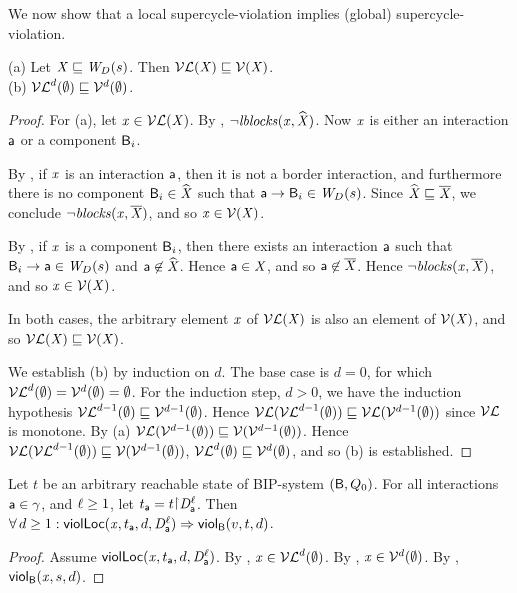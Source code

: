 We now show that a local supercycle-violation implies (global) supercycle-violation.

\begin{proposition}
\label{prop:lV-subg-V}
(a) Let $\XS \subg \lwfg{B}{s}{\DS}$. Then $\lVF{\XS} \subg \VF{\XS}$.\\
(b) $\lVFs^{d} (\ewfg) \subg \VFs^{d} (\ewfg)$.
\end{proposition}
%
\begin{proof}
For (a), let $\ndx \in \lVF{\XS}$. By , $\neg \lblocks{\ndx}{\complL{\XS}}$.
Now $\ndx$ is either an interaction $\act$ or a component $\B_i$. 

By , if $\ndx$ is an interaction $\act$, then it is not a border interaction, and furthermore there is no
component $\B_i \in \complL{\XS}$ such that $\act \ar \B_i \in \lwfg{B}{s}{\DS}$. 
Since $\complL{\XS} \subg \compl{\XS}$, we conclude $\neg \blocks{\ndx}{\compl{\XS}}$, and so $\ndx \in \VF{\XS}$.

By , if $\ndx$ is a component $\B_i$, then there exists an interaction $\act$ such that 
$\B_i \ar \act \in \lwfg{B}{s}{\DS}$ and $\act \not\in \complL{\XS}$. Hence $\act \in \XS$, and so $\act \not\in \compl{\XS}$.
Hence  $\neg \blocks{\ndx}{\compl{\XS}}$, and so $\ndx \in \VF{\XS}$.

In both cases, the arbitrary element $\ndx$ of $\lVF{\XS}$ is also an element of $\VF{\XS}$, and so $\lVF{\XS} \subg \VF{\XS}$.

We establish (b) by induction on $d$. The base case is $d=0$, for which $\lVFs^{d} (\ewfg) = \VFs^{d} (\ewfg) = \ewfg$.
For the induction step, $d > 0$, we have the induction hypothesis $\lVFs^{d-1} (\ewfg) \subg \VFs^{d-1} (\ewfg)$. 
Hence $\lVF{\lVFs^{d-1} (\ewfg)} \subg \lVF{\VFs^{d-1} (\ewfg)}$ since $\lVFs$ is monotone.
By (a) $\lVF{\VFs^{d-1} (\ewfg)} \subg \VF{\VFs^{d-1} (\ewfg)}$. 
Hence  $\lVF{\lVFs^{d-1} (\ewfg)} \subg \VF{\VFs^{d-1} (\ewfg)}$, \ie
  $\lVFs^{d} (\ewfg) \subg \VFs^{d} (\ewfg)$, and so (b) is established.
\end{proof}


\begin{proposition}
\label{prop:locScViol-implies-scViol}
\label{prop:lviol-implies-viol}
Let $t$ be an arbitrary reachable state of BIP-system $(\B, Q_0)$.
For all interactions $\act \in \gamma$, and $\l \ge 1$, let $t_\act = t \pj \dsk{\act}{\l}$.
Then\\
\ind $\fa d \ge 1: \locScViol{\ndx}{d}{t_\act}{\act}{\l} \imp \scViol{v}{d}{t}$.
\end{proposition}
%
\begin{proof}
Assume $\locScViol{\ndx}{d}{t_\act}{\act}{\l}$.
By ,  $\ndx  \in \lVFs^{d} (\ewfg)$.
By ,  $\ndx  \in \VFs^{d} (\ewfg)$.
By , $\scVd{\ndx}{d}{s}$.
\end{proof}
